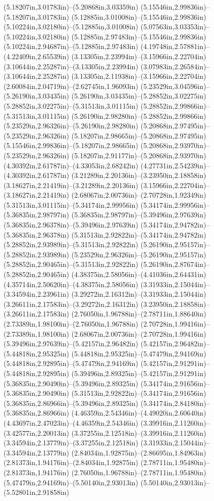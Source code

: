 (5.18207in,3.01783in)--(5.20868in,3.03359in) (5.15546in,2.99836in)--(5.18207in,3.01783in) (5.12885in,3.01008in)--(5.15546in,2.99836in) (5.10224in,3.02180in)--(5.12885in,3.01008in) (5.07563in,3.03353in)--(5.10224in,3.02180in) (5.12885in,2.97483in)--(5.15546in,2.99836in) (5.10224in,2.94687in)--(5.12885in,2.97483in) (4.19748in,2.57881in)--(4.22409in,2.65539in) (3.13305in,2.23994in)--(3.15966in,2.22704in) (3.10644in,2.25287in)--(3.13305in,2.23994in) (3.07983in,2.26584in)--(3.10644in,2.25287in) (3.13305in,2.11938in)--(3.15966in,2.22704in) (2.60084in,2.04719in)--(2.62745in,1.96093in) (5.23529in,3.04596in)--(5.26190in,3.03435in) (5.26190in,3.03435in)--(5.28852in,3.02275in) (5.28852in,3.02275in)--(5.31513in,3.01115in) (5.28852in,2.99866in)--(5.31513in,3.01115in) (5.26190in,2.98280in)--(5.28852in,2.99866in) (5.23529in,2.96326in)--(5.26190in,2.98280in) (5.20868in,2.97495in)--(5.23529in,2.96326in) (5.18207in,2.98665in)--(5.20868in,2.97495in) (5.15546in,2.99836in)--(5.18207in,2.98665in) (5.20868in,2.93970in)--(5.23529in,2.96326in) (5.18207in,2.91177in)--(5.20868in,2.93970in) (4.30392in,2.61787in)--(4.33053in,2.68242in) (4.27731in,2.54239in)--(4.30392in,2.61787in) (3.21289in,2.20136in)--(3.23950in,2.18858in) (3.18627in,2.21419in)--(3.21289in,2.20136in) (3.15966in,2.22704in)--(3.18627in,2.21419in) (2.68067in,2.00736in)--(2.70728in,1.92349in) (5.31513in,3.01115in)--(5.34174in,2.99956in) (5.34174in,2.99956in)--(5.36835in,2.98797in) (5.36835in,2.98797in)--(5.39496in,2.97639in) (5.36835in,2.96378in)--(5.39496in,2.97639in) (5.34174in,2.94782in)--(5.36835in,2.96378in) (5.31513in,2.92822in)--(5.34174in,2.94782in) (5.28852in,2.93989in)--(5.31513in,2.92822in) (5.26190in,2.95157in)--(5.28852in,2.93989in) (5.23529in,2.96326in)--(5.26190in,2.95157in) (5.28852in,2.90465in)--(5.31513in,2.92822in) (5.26190in,2.87674in)--(5.28852in,2.90465in) (4.38375in,2.58056in)--(4.41036in,2.64431in) (4.35714in,2.50620in)--(4.38375in,2.58056in) (3.31933in,2.15044in)--(3.34594in,2.23961in) (3.29272in,2.16312in)--(3.31933in,2.15044in) (3.26611in,2.17583in)--(3.29272in,2.16312in) (3.23950in,2.18858in)--(3.26611in,2.17583in) (2.76050in,1.96788in)--(2.78711in,1.88640in) (2.73389in,1.98100in)--(2.76050in,1.96788in) (2.70728in,1.99416in)--(2.73389in,1.98100in) (2.68067in,2.00736in)--(2.70728in,1.99416in) (5.39496in,2.97639in)--(5.42157in,2.96482in) (5.42157in,2.96482in)--(5.44818in,2.95325in) (5.44818in,2.95325in)--(5.47479in,2.94169in) (5.44818in,2.92895in)--(5.47479in,2.94169in) (5.42157in,2.91291in)--(5.44818in,2.92895in) (5.39496in,2.89325in)--(5.42157in,2.91291in) (5.36835in,2.90490in)--(5.39496in,2.89325in) (5.34174in,2.91656in)--(5.36835in,2.90490in) (5.31513in,2.92822in)--(5.34174in,2.91656in) (5.36835in,2.86966in)--(5.39496in,2.89325in) (5.34174in,2.84180in)--(5.36835in,2.86966in) (4.46359in,2.54346in)--(4.49020in,2.60640in) (4.43697in,2.47023in)--(4.46359in,2.54346in) (3.39916in,2.11260in)--(3.42577in,2.20013in) (3.37255in,2.12518in)--(3.39916in,2.11260in) (3.34594in,2.13779in)--(3.37255in,2.12518in) (3.31933in,2.15044in)--(3.34594in,2.13779in) (2.84034in,1.92875in)--(2.86695in,1.84963in) (2.81373in,1.94176in)--(2.84034in,1.92875in) (2.78711in,1.95480in)--(2.81373in,1.94176in) (2.76050in,1.96788in)--(2.78711in,1.95480in) (5.47479in,2.94169in)--(5.50140in,2.93013in) (5.50140in,2.93013in)--(5.52801in,2.91858in) 